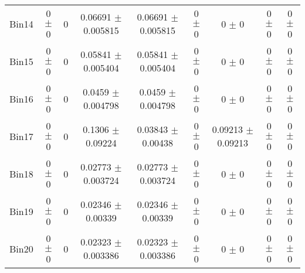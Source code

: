 \begin{tabular}{@{\extracolsep{4pt}}lcccccccc@{}}
     Bin14 & 0 $\pm$ 0 & 0 & 0.06691 $\pm$ 0.005815 & 0.06691 $\pm$ 0.005815 & 0 $\pm$ 0 & 0 $\pm$ 0 & 0 $\pm$ 0 & 0 $\pm$ 0 \\ 
     Bin15 & 0 $\pm$ 0 & 0 & 0.05841 $\pm$ 0.005404 & 0.05841 $\pm$ 0.005404 & 0 $\pm$ 0 & 0 $\pm$ 0 & 0 $\pm$ 0 & 0 $\pm$ 0 \\ 
     Bin16 & 0 $\pm$ 0 & 0 & 0.0459 $\pm$ 0.004798 & 0.0459 $\pm$ 0.004798 & 0 $\pm$ 0 & 0 $\pm$ 0 & 0 $\pm$ 0 & 0 $\pm$ 0 \\ 
     Bin17 & 0 $\pm$ 0 & 0 & 0.1306 $\pm$ 0.09224 & 0.03843 $\pm$ 0.00438 & 0 $\pm$ 0 & 0.09213 $\pm$ 0.09213 & 0 $\pm$ 0 & 0 $\pm$ 0 \\ 
     Bin18 & 0 $\pm$ 0 & 0 & 0.02773 $\pm$ 0.003724 & 0.02773 $\pm$ 0.003724 & 0 $\pm$ 0 & 0 $\pm$ 0 & 0 $\pm$ 0 & 0 $\pm$ 0 \\ 
     Bin19 & 0 $\pm$ 0 & 0 & 0.02346 $\pm$ 0.00339 & 0.02346 $\pm$ 0.00339 & 0 $\pm$ 0 & 0 $\pm$ 0 & 0 $\pm$ 0 & 0 $\pm$ 0 \\ 
     Bin20 & 0 $\pm$ 0 & 0 & 0.02323 $\pm$ 0.003386 & 0.02323 $\pm$ 0.003386 & 0 $\pm$ 0 & 0 $\pm$ 0 & 0 $\pm$ 0 & 0 $\pm$ 0 \\ 
\hline\hline
  \end{tabular}
